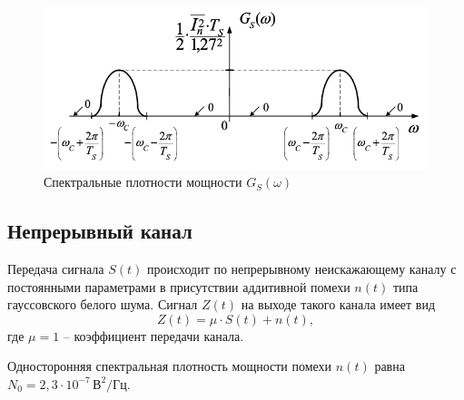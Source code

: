 \documentclass[a4paper, 12pt]{article}
\begin{document}
\begin{enumerate}
  \begin{figure}[H]
    \centering
    \includegraphics{GSOmega}
    \caption{Спектральные плотности мощности $G_S(\omega)$}
  \end{figure}
\end{enumerate}

\subsection{Непрерывный канал}
Передача сигнала $S(t)$ происходит по непрерывному неискажающему 
каналу с постоянными параметрами в присутствии аддитивной помехи
$n(t)$ типа гауссовского белого шума. Сигнал $Z(t)$ на выходе такого 
канала имеет вид
\begin{equation}
  Z(t)=\mu\cdot S(t)+n(t),
\end{equation}
где $\mu=1$ -- коэффициент передачи канала. 

Односторонняя спектральная плотность мощности помехи $n(t)$ 
равна $N_0=2,3\cdot 10^{-7}\,В^2/Гц$.
\end{document}
